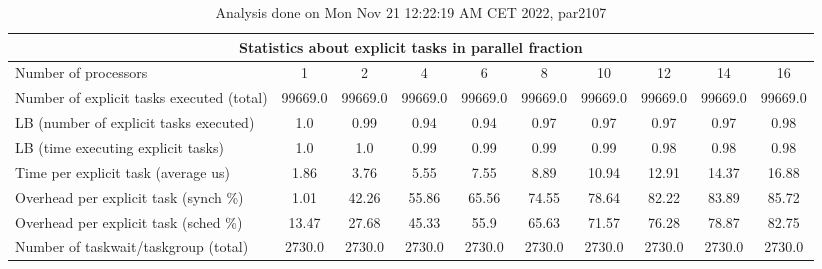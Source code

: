 \begin{table}[h]
\begin{center}
\begin{tabular}{|l|c|c|c|c|c|c|c|c|c|}
\hline
\multicolumn{10}{|c|}{Statistics about explicit tasks in parallel fraction} \\
\hline
\hline
Number of processors & 1 & 2 & 4 & 6 & 8 & 10 & 12 & 14 & 16 \\
\hline
\hline
Number of explicit tasks executed (total)        &         99669.0 &         99669.0 &         99669.0 &         99669.0 &         99669.0 &         99669.0 &         99669.0 &         99669.0 &         99669.0 \\
\hline
LB (number of explicit tasks executed)           &             1.0 &            0.99 &            0.94 &            0.94 &            0.97 &            0.97 &            0.97 &            0.97 &            0.98 \\
\hline
LB (time executing explicit tasks)               &             1.0 &             1.0 &            0.99 &            0.99 &            0.99 &            0.99 &            0.98 &            0.98 &            0.98 \\
\hline
Time per explicit task (average us)                 &            1.86 &            3.76 &            5.55 &            7.55 &            8.89 &           10.94 &           12.91 &           14.37 &           16.88 \\
\hline
Overhead per explicit task (synch \%)             &            1.01 &           42.26 &           55.86 &           65.56 &           74.55 &           78.64 &           82.22 &           83.89 &           85.72 \\
\hline
Overhead per explicit task (sched \%)             &           13.47 &           27.68 &           45.33 &            55.9 &           65.63 &           71.57 &           76.28 &           78.87 &           82.75 \\
\hline
Number of taskwait/taskgroup (total)             &          2730.0 &          2730.0 &          2730.0 &          2730.0 &          2730.0 &          2730.0 &          2730.0 &          2730.0 &          2730.0 \\
\hline
\end{tabular}
\end{center}
\caption{ Analysis done on Mon Nov 21 12:22:19 AM CET 2022, par2107}
\end{table}
